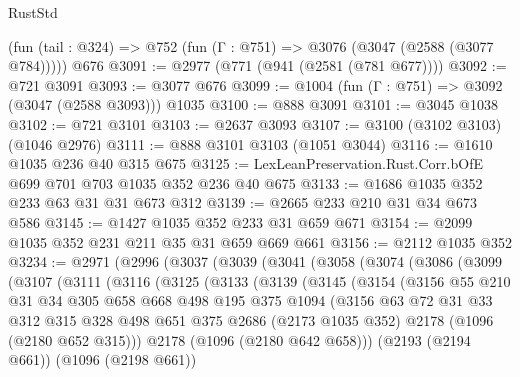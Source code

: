 \begin{lexlean}{RustStd}
\begin{coremodule}
    (fun (tail : @324) => @752 (fun (Γ : @751) => @3076 (@3047 (@2588 (@3077 @784)))))
    @676
@3091 := @2977 (@771 (@941 (@2581 (@781 @677))))
@3092 := @721 @3091
@3093 := @3077 @676
@3099 := @1004 (fun (Γ : @751) => @3092 (@3047 (@2588 @3093))) @1035
@3100 := @888 @3091
@3101 := @3045 @1038
@3102 := @721 @3101
@3103 := @2637 @3093
@3107 := @3100 (@3102 @3103) (@1046 @2976)
@3111 := @888 @3101 @3103 (@1051 @3044)
@3116 := @1610 @1035 @236 @40 @315 @675
@3125 := LexLeanPreservation.Rust.Corr.bOfE @699 @701 @703 @1035 @352 @236 @40 @675
@3133 := @1686 @1035 @352 @233 @63 @31 @31 @673 @312
@3139 := @2665 @233 @210 @31 @34 @673 @586
@3145 := @1427 @1035 @352 @233 @31 @659 @671
@3154 := @2099 @1035 @352 @231 @211 @35 @31 @659 @669 @661
@3156 := @2112 @1035 @352
@3234 := @2971
    (@2996
      (@3037
        (@3039
          (@3041
            (@3058
              (@3074
                (@3086
                  (@3099
                    (@3107
                      (@3111
                        (@3116
                          (@3125
                            (@3133
                              (@3139
                                (@3145
                                  (@3154
                                    (@3156
                                      @55
                                      @210
                                      @31
                                      @34
                                      @305
                                      @658
                                      @668
                                      @498
                                      @195
                                      @375
                                      @1094
                                      (@3156
                                        @63
                                        @72
                                        @31
                                        @33
                                        @312
                                        @315
                                        @328
                                        @498
                                        @651
                                        @375
                                        @2686
                                        (@2173 @1035 @352)
                                        @2178
                                        (@1096 (@2180 @652 @315)))
                                      @2178
                                      (@1096 (@2180 @642 @658)))
                                    (@2193 (@2194 @661))
                                    (@1096 (@2198 @661))

\end{coremodule}
\end{lexlean}
